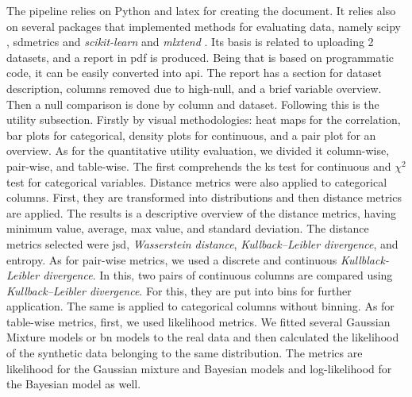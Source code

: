 The pipeline relies on Python and latex for creating the document. It relies also on several packages that implemented methods for evaluating data, namely scipy \cite{scipy}, sdmetrics \cite{sdv} and \textit{scikit-learn} \cite{scikit-learn} and \textit{mlxtend} \cite{mlxtend}. Its basis is related to uploading 2 datasets, and a report in pdf is produced. Being that is based on programmatic code, it can be easily converted into \ac{api}.
The report has a section for dataset description, columns removed due to high-null, and a brief variable overview. Then a null comparison is done by column and dataset. Following this is the utility subsection. Firstly by visual methodologies: heat maps for the correlation, bar plots for categorical, density plots for continuous, and a pair plot for an overview. As for the quantitative utility evaluation, we divided it column-wise, pair-wise, and table-wise. The first comprehends the \ac{ks} test for continuous and $\chi^2$ test for categorical variables.  Distance metrics were also applied to categorical columns. First, they are transformed into distributions and then distance metrics are applied. The results is a descriptive overview of the distance metrics, having minimum value, average, max value, and standard deviation. The distance metrics selected were \ac{jsd}, \textit{Wasserstein distance}, \textit{Kullback–Leibler divergence}, and entropy.
As for pair-wise metrics, we used a discrete and continuous \textit{Kullblack-Leibler divergence}. In this, two pairs of continuous columns are compared using \textit{Kullback–Leibler divergence}. For this, they are put into bins for further application. The same is applied to categorical columns without binning.
As for table-wise metrics, first, we used likelihood metrics. We fitted several Gaussian Mixture models or \ac{bn} models to the real data and then calculated the likelihood of the synthetic data belonging to the same distribution. The metrics are likelihood for the Gaussian mixture and Bayesian models and log-likelihood for the Bayesian model as well.

